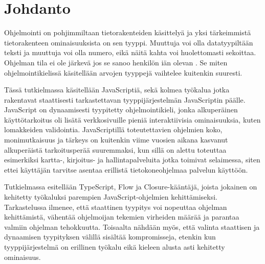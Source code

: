 \chapter{Johdanto} \label{Johdanto}

Ohjelmointi on pohjimmiltaan tietorakenteiden käsittelyä ja yksi tärkeimmistä
tietorakenteen ominaisuuksista on sen tyyppi. Muuttuja  voi olla
datatyypiltään teksti ja muuttuja  voi olla numero, eikä näitä kahta voi
huolettomasti sekoittaa. Ohjelman tila ei ole järkevä jos se sanoo henkilön
iän olevan . Se miten ohjelmointikielissä käsitellään arvojen tyyppejä
vaihtelee kuitenkin suuresti.

Tässä tutkielmassa käsitellään JavaScriptiä, sekä kolmea työkalua jotka
rakentavat staattisesti tarkastettavan tyyppijärjestelmän
JavaScriptin päälle. JavaScript on dynaamisesti tyypitetty ohjelmointikieli,
jonka alkuperäinen käyttötarkoitus oli lisätä verkkosivuille pieniä
interaktiivisia ominaisuuksia, kuten lomakkeiden validointia. JavaScriptillä
toteutettavien ohjelmien koko, monimutkaisuus ja tärkeys on kuitenkin viime
vuosien aikana kasvanut alkuperäistä tarkoitusperää suuremmaksi, kun sillä on
alettu toteuttaa esimerkiksi kartta-, kirjoitus- ja hallintapalveluita jotka
toimivat selaimessa, siten ettei käyttäjän tarvitse asentaa erillistä
tietokoneohjelmaa palvelun käyttöön.

Tutkielmassa esitellään TypeScript, Flow ja Closure-kääntäjä, joista jokainen on
kehitetty työkaluksi parempien JavaScript-ohjelmien kehittämiseksi.
Tarkastelussa ilmenee, että staattinen tyypitys voi nopeuttaa ohjelman
kehittämistä, vähentää ohjelmoijan tekemien virheiden määrää ja parantaa
valmiin ohjelman tehokkuutta. Toisaalta nähdään myös, että valinta staattisen
ja dynaamisen tyypityksen välillä sisältää kompromisseja, etenkin kun
tyyppijärjestelmä on erillinen työkalu eikä kieleen alusta asti kehitetty
ominaisuus.
